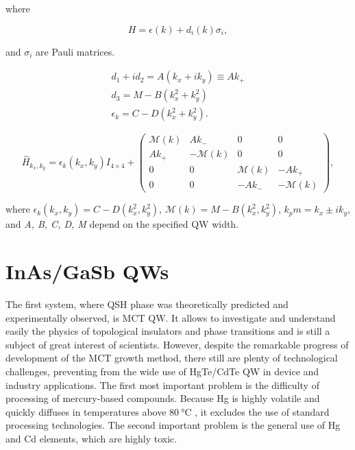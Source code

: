 \documentclass[titlepage,a4paper]{book}
\newcommand{\wciecie}{\quad\phantom{v}}
\begin{document}
where 

\begin{equation}
\label{3}
H = \epsilon (k) + d_i (k) \sigma_i,
\end{equation}

and $\sigma_i$ are Pauli matrices.

\begin{equation}
\begin{aligned}
\label{4}
d_1 + id_2 = A(k_x + ik_y) \equiv Ak_+ \\
d_3 = M - B(k_x^2 + k_y^2) \\
\epsilon_k = C - D(k_x^2 + k_y^2).
\end{aligned}
\end{equation}

\begin{equation}
\label{asd}
\hat{H}_{k_x, k_y} = \epsilon_k(k_x, k_y) I_{4 \times 4} + \left( \begin{array}{cccc}
\mathcal{M}(k) & Ak_- & 0 & 0 \\
Ak_+ & -\mathcal{M}(k) & 0 & 0 \\
0 & 0 & \mathcal{M}(k) & -Ak_+ \\
0 & 0 & -Ak_- & -\mathcal{M}(k) \end{array} \right),
\end{equation}

where $\epsilon_k(k_x, k_y) = C - D(k_x^2, k_y^2)$, $\mathcal{M}(k) = M - B(k_x^2, k_y^2)$, $k_pm = k_x \pm ik_y$, and \textit{A, B, C, D, M} depend on the specified QW width.

\chapter{InAs/GaSb QWs}
\wciecie
The first system, where QSH phase was theoretically predicted and experimentally observed, is MCT QW. It allows to investigate and understand easily the physics of topological insulators and phase transitions and is still a subject of great interest of scientists. However, despite the remarkable progress of development of the MCT growth method, there still are plenty of technological challenges, preventing from the wide use of HgTe/CdTe QW in device and industry applications. The first most important problem is the difficulty of processing of mercury-based compounds. Because Hg is highly volatile and quickly diffuses in temperatures above $\SI{80}{\degreeCelsius}$ \cite{Daumer_MCT_temperature}, it excludes the use of standard processing technologies. The second important problem is the general use of Hg and Cd elements, which are highly toxic.
\end{document}
